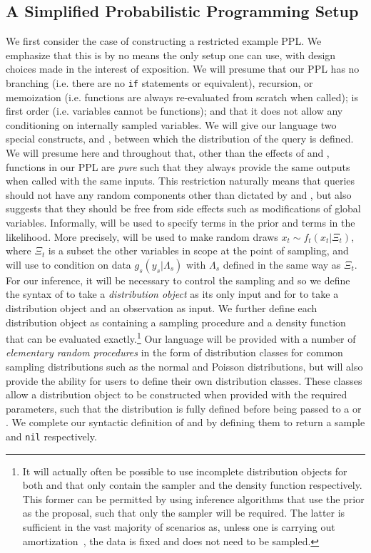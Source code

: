 \subsection{A Simplified Probabilistic Programming Setup}
\label{sec:probprog:models:first}

We first consider the case of constructing a restricted example PPL.  We emphasize that
this is by no means the only setup one can use, with design choices made in the interest of exposition.
We will presume that our PPL
has no branching (i.e. there are no \texttt{if} statements or equivalent), recursion, or memoization
(i.e. functions are always re-evaluated from scratch when called); is first order
(i.e. variables cannot be functions); and that it does not allow 
any conditioning on internally sampled variables.  
We will give our language
two special constructs, \sample and \observe, between which the distribution of the
query is defined.  We will presume here and throughout that, other than the effects of \sample and \observe,
functions in our PPL are \emph{pure} such that they always provide the same outputs when
called with the same inputs.  This restriction naturally means that queries should not have
any random components other than dictated by \sample and \observe, but also suggests that
they should be free from side effects such as modifications of global variables.
Informally, \sample will be used to specify terms in the prior and \observe terms in the
likelihood.  More precisely, \sample will be used to make random draws $x_t \sim f_t(x_t | \Xi_t)$,
where $\Xi_t$ is a subset the other variables in scope at the point of sampling, and \observe will use to condition on
data $g_s(y_s|\Lambda_s)$ with $\Lambda_s$ defined in the same way as $\Xi_t$.  
For our inference, it will be necessary to control the sampling and so we define
the syntax of \sample to take a \emph{distribution object} as its only input and for \observe
to take a distribution object and an observation as input.  We further define each distribution
object as containing a sampling procedure and a density function that can be evaluated
exactly.\footnote{It will actually often be possible to use incomplete distribution objects for
	both \sample and \observe that only contain the sampler and the density function respectively.
	This former can be permitted by using inference algorithms that use the prior as the proposal, such
	that only the sampler will be required.  The latter is sufficient in the vast majority of scenarios as, unless
	one is carrying out amortization~\citep{paige2016inference,le2017inference}, the data is fixed and does
	not need to be sampled.}  Our language will be provided with a number of \emph{elementary random
	procedures} in
the form of distribution classes for common sampling distributions such as the normal and Poisson
distributions, but will also provide the ability for users to define their own distribution classes.   These
classes allow a distribution object to be constructed when provided with the required parameters, such that
the distribution is fully defined before being passed to a \sample or \observe.
We complete our syntactic definition of \sample and \observe by defining them to return a sample and \texttt{nil}
respectively.

